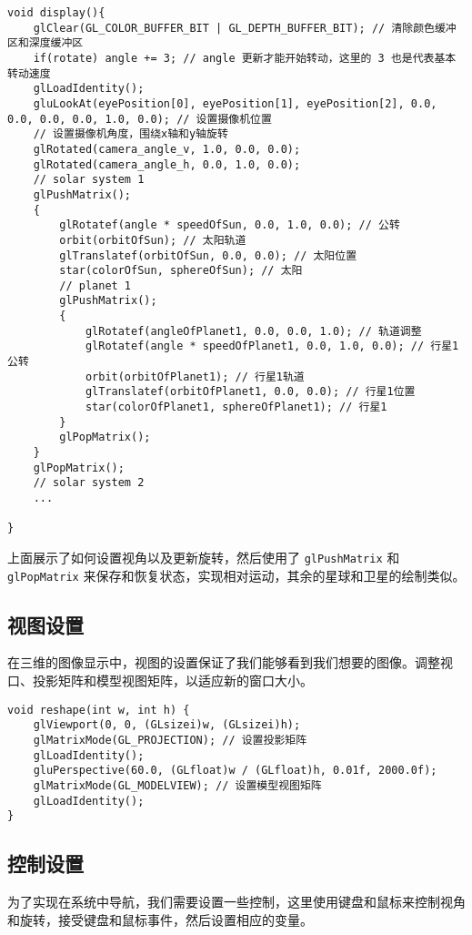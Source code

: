 \documentclass[12pt,hyperref,a4paper,UTF8]{ctexart}
\begin{document}
\begin{verbatim}
void display(){
    glClear(GL_COLOR_BUFFER_BIT | GL_DEPTH_BUFFER_BIT); // 清除颜色缓冲区和深度缓冲区
    if(rotate) angle += 3; // angle 更新才能开始转动，这里的 3 也是代表基本转动速度
    glLoadIdentity();
    gluLookAt(eyePosition[0], eyePosition[1], eyePosition[2], 0.0, 0.0, 0.0, 0.0, 1.0, 0.0); // 设置摄像机位置
    // 设置摄像机角度，围绕x轴和y轴旋转
    glRotated(camera_angle_v, 1.0, 0.0, 0.0); 
    glRotated(camera_angle_h, 0.0, 1.0, 0.0);
    // solar system 1
    glPushMatrix();
    {
        glRotatef(angle * speedOfSun, 0.0, 1.0, 0.0); // 公转
        orbit(orbitOfSun); // 太阳轨道
        glTranslatef(orbitOfSun, 0.0, 0.0); // 太阳位置
        star(colorOfSun, sphereOfSun); // 太阳
        // planet 1
        glPushMatrix();
        {
            glRotatef(angleOfPlanet1, 0.0, 0.0, 1.0); // 轨道调整
            glRotatef(angle * speedOfPlanet1, 0.0, 1.0, 0.0); // 行星1公转
            orbit(orbitOfPlanet1); // 行星1轨道
            glTranslatef(orbitOfPlanet1, 0.0, 0.0); // 行星1位置
            star(colorOfPlanet1, sphereOfPlanet1); // 行星1
        }
        glPopMatrix();
    }
    glPopMatrix();
    // solar system 2
    ...

}
\end{verbatim}

上面展示了如何设置视角以及更新旋转，然后使用了 \texttt{glPushMatrix} 和 \texttt{glPopMatrix} 来保存和恢复状态，实现相对运动，其余的星球和卫星的绘制类似。

\subsection{视图设置}
在三维的图像显示中，视图的设置保证了我们能够看到我们想要的图像。调整视口、投影矩阵和模型视图矩阵，以适应新的窗口大小。

\begin{verbatim}
void reshape(int w, int h) {
    glViewport(0, 0, (GLsizei)w, (GLsizei)h);
    glMatrixMode(GL_PROJECTION); // 设置投影矩阵
    glLoadIdentity();
    gluPerspective(60.0, (GLfloat)w / (GLfloat)h, 0.01f, 2000.0f);
    glMatrixMode(GL_MODELVIEW); // 设置模型视图矩阵
    glLoadIdentity();
}
\end{verbatim}

\subsection{控制设置}
为了实现在系统中导航，我们需要设置一些控制，这里使用键盘和鼠标来控制视角和旋转，接受键盘和鼠标事件，然后设置相应的变量。
\end{document}
